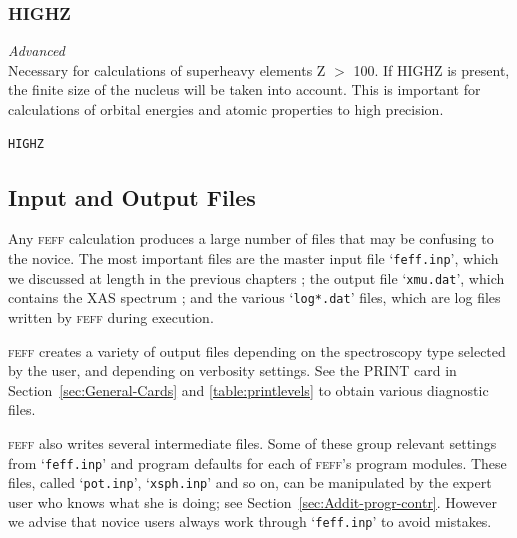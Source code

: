 \documentclass[11pt,oneside]{report} %
\renewcommand{\htmlref}[2]{\hyperlink{#2}{#1}}
\newcommand{\program}[1]{\textsc{#1}}
\newcommand{\feff}{\program{feff}}
\newenvironment{Card}[4]%
      {\vspace{3ex}%
        \subsection{#1}
        \quad\textsl{#3}\newline
        \quad\texttt{#2}\newline%
        \label{card:#4}\\}
      {}
\newcommand{\file}[1]{`\texttt{#1}'}
\renewcommand{\htmlref}[2]{{#1}} %
\begin{document}
\begin{Card}{HIGHZ}{}{Advanced}{hig}
Necessary for calculations of superheavy elements Z $>$ 100. If HIGHZ is present, the finite size of the nucleus will be taken into account.
This is important for calculations of orbital energies and atomic properties to high precision.

\begin{verbatim}
HIGHZ
\end{verbatim}
\end{Card}

\begin{latexonly}%

\chapter{Input and Output Files}
\label{sec:Input-and-Output-Files}

Any {\feff} calculation produces a large number of files that may be confusing to the novice.  
The most important files are the master input file \file{feff.inp}, which we discussed at length in the previous chapters ;
the output file \file{xmu.dat}, which contains the XAS spectrum ; and the various \file{log*.dat} files, which are log files
written by {\feff} during execution.  


{\feff} creates a variety of output files depending on the spectroscopy type selected by the user, and depending on verbosity settings.
See the \htmlref{PRINT}{card:pri} card in Section~\ref{sec:General-Cards} and \ref{table:printlevels} to obtain various diagnostic files.

{\feff} also writes several intermediate files.  Some of these group relevant settings from \file{feff.inp} and program defaults for each of 
{\feff}'s program modules.  These files, called \file{pot.inp}, \file{xsph.inp} and so on, can be manipulated by the expert user who knows what she is doing; see Section~\ref{sec:Addit-progr-contr}.
However we advise that novice users always work through \file{feff.inp} to avoid mistakes. 


\end{latexonly}
\end{document}
